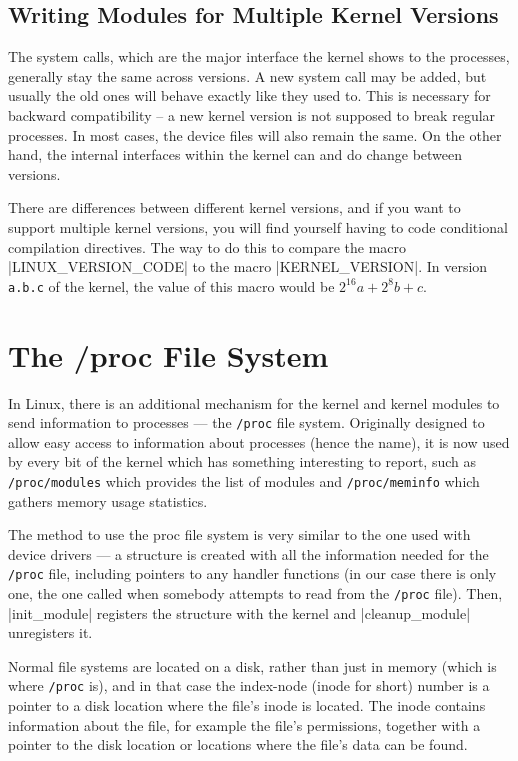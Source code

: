 \documentclass[10pt, oneside]{book}
\begin{document}

\subsection{Writing Modules for Multiple Kernel Versions}
\label{sec:modules_for_versions}
The system calls, which are the major interface the kernel shows to the processes, generally stay the same across versions.
A new system call may be added, but usually the old ones will behave exactly like they used to.
This is necessary for backward compatibility -- a new kernel version is not supposed to break regular processes.
In most cases, the device files will also remain the same. On the other hand, the internal interfaces within the kernel can and do change between versions.

There are differences between different kernel versions, and if you want to support multiple kernel versions, you will find yourself having to code conditional compilation directives.
The way to do this to compare the macro \cpp|LINUX_VERSION_CODE| to the macro \cpp|KERNEL_VERSION|.
In version \verb|a.b.c| of the kernel, the value of this macro would be \(2^{16}a+2^{8}b+c\).

\section{The /proc File System}
\label{sec:procfs}
In Linux, there is an additional mechanism for the kernel and kernel modules to send information to processes --- the \verb|/proc| file system.
Originally designed to allow easy access to information about processes (hence the name), it is now used by every bit of the kernel which has something interesting to report, such as \verb|/proc/modules| which provides the list of modules and \verb|/proc/meminfo| which gathers memory usage statistics.

The method to use the proc file system is very similar to the one used with device drivers --- a structure is created with all the information needed for the \verb|/proc| file, including pointers to any handler functions (in our case there is only one, the one called when somebody attempts to read from the \verb|/proc| file).
Then, \cpp|init_module| registers the structure with the kernel and \cpp|cleanup_module| unregisters it.

Normal file systems are located on a disk, rather than just in memory (which is where \verb|/proc| is), and in that case the index-node (inode for short) number is a pointer to a disk location where the file's inode is located.
The inode contains information about the file, for example the file's permissions, together with a pointer to the disk location or locations where the file's data can be found.
\end{document}
